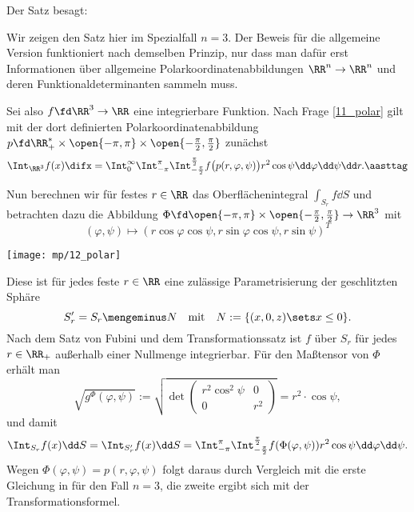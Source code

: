 \begin{antwort}
  Der Satz besagt: 

  \medskip\noindent

  \medskip\noindent
  Wir zeigen den Satz hier im Spezialfall $n=3$. Der Beweis für die allgemeine 
  Version funktioniert nach demselben Prinzip, nur dass man dafür erst 
  Informationen über allgemeine Polarkoordinatenabbildungen 
  $\RR^n\to\RR^n$ und deren Funktionaldeterminanten sammeln muss. 

  Sei also $f\fd \RR^3\to\RR$ eine integrierbare Funktion. 
  Nach Frage \ref{11_polar} gilt mit der dort definierten 
  Polarkoordinatenabbildung 
  $p\fd \RR_+^* \times \open{-\pi,\pi} \times 
  \open{ -\frac{\pi}{2}, \frac{\pi}{2} }$ zunächst 
  \[
  \Int_{\RR^3} f(x) \difx = 
  \Int_0^\infty
  \Int_{-\pi}^\pi 
  \Int_{-\frac{\pi}{2}}^{\frac{\pi}{2}} 
  f\big( p( r,\varphi,\psi) \big) r^2 \cos\psi  \dd \varphi \dd \psi \dd r.
  \aasttag
  \]

  Nun berechnen wir für festes $r\in\RR$ das Oberflächenintegral $
  \int_{S_r} f \dd S$ und betrachten dazu die 
  Abbildung $\Phi \fd \open{-\pi,\pi} \times 
  \open{ -\frac{\pi}{2}, \frac{\pi}{2} } \to \RR^3$ mit 
  \[
  (\varphi,\psi) \mapsto ( 
  r  \cos \varphi \cos \psi,
  r   \sin \varphi \cos\psi, 
  r \sin \psi )^T
  \]

  \begin{center}
    \texttt{[image: mp/12\_polar]}
    \label{fig:12_polar}
  \end{center}

  Diese ist für jedes feste $r\in\RR$ eine zulässige Parametrisierung der 
  geschlitzten Sphäre 
  \[
  S'_r = S_r \mengeminus N\quad\text{mit}\quad 
  N := \{ (x, 0, z)\sets x \le 0 \}.
  \]
  Nach dem Satz von Fubini und dem Transformationssatz ist $f$ über $S_r$ 
  für jedes $r\in\RR_+$ außerhalb einer Nullmenge integrierbar. 
  Für den Maßtensor von $\Phi$ erhält man 
  \[
  \sqrt{g^\Phi(\varphi,\psi)} := \sqrt{\det \begin{pmatrix} 
      r^2 \cos^2 \psi & 0 \\ 0 & r^2 
    \end{pmatrix} } = r^2\cdot \cos \psi,
  \]
  und damit 
  \[
  \Int_{S_r} f(x) \dd S = 
  \Int_{S'_r} f(x) \dd S =\Int_{-\pi}^\pi 
  \Int_{-\frac{\pi}{2}}^{\frac{\pi}{2}} 
  f( \Phi(\varphi,\psi) ) r^2 \cos \psi 
  \dd\varphi  \dd \psi.
  \]
  Wegen $\Phi(\varphi,\psi)=p(r,\varphi,\psi)$ folgt daraus 
  durch Vergleich mit {\astastref} die erste Gleichung 
  in {\astref} für den Fall $n=3$, 
  die zweite ergibt sich mit der Transformationsformel. 
  \AntEnd 
\end{antwort}



